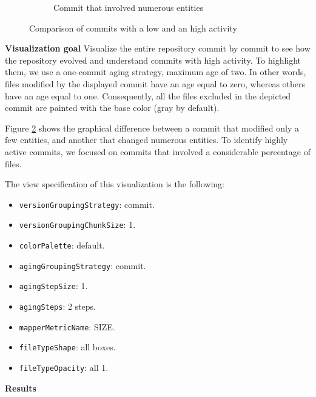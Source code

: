 \begin{figure}[t]
\begin{subfigure}{0.42\textwidth}
        \caption{Commit that involved numerous entities} \label{fig:JetUML_V0E1}
    \end{subfigure}
    \caption{Comparison of commits with a low and an high activity} 
    \label{fig:JetUML_V0E}
\end{figure}
\bigbreak
\textbf{Visualization goal} Visualize the entire repository commit by commit to see how the repository evolved and understand commits with high activity. 
To highlight them, we use a one-commit aging strategy, maximum age of two. In other words, files modified by the displayed commit have an age equal to zero, whereas others have an age equal to one.
Consequently, all the files excluded in the depicted commit are painted with the base color (gray by default). 

Figure \ref{fig:JetUML_V0E} shows the graphical difference between a commit that modified only a few entities, and another that changed numerous entities. To identify highly active commits, we focused on commits that involved a considerable percentage of files.

The view specification of this visualization is the following:
\begin{itemize}
    \item \texttt{versionGroupingStrategy}: commit.
    \item \texttt{versionGroupingChunkSize}: 1. 
    \item \texttt{colorPalette}: default.
    \item \texttt{agingGroupingStrategy}: commit.
    \item \texttt{agingStepSize}: 1.
    \item \texttt{agingSteps}: 2 steps. 
    \item \texttt{mapperMetricName}: SIZE. 
    \item \texttt{fileTypeShape}: all boxes.
    \item \texttt{fileTypeOpacity}: all 1. 
\end{itemize}

\textbf{Results}

